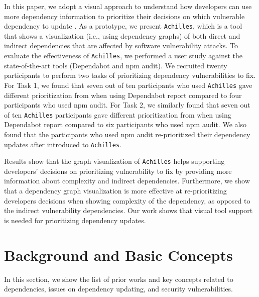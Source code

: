\documentclass[conference]{IEEEtran}
\begin{document}
	In this paper, we adopt a visual approach to understand how developers can use more dependency information to prioritize their decisions on which vulnerable dependency to update \citep{Chen:VISSOFT2020}. 
	As a prototype, we present \texttt{Achilles}, which is a tool that shows a visualization (i.e., using dependency graphs) of both direct and indirect dependencies that are affected by software vulnerability attacks.
	To evaluate the effectiveness of \texttt{Achilles}, we performed a user study against the state-of-the-art tools (Dependabot and npm audit). 
	We recruited twenty participants to perform two tasks of prioritizing dependency vulnerabilities to fix. For Task 1, we found that seven out of ten participants who used \texttt{Achilles} gave different prioritization from when using Dependabot report compared to four participants who used npm audit. For Task 2, we similarly found that seven out of ten \texttt{Achilles} participants gave different prioritization from when using Dependabot report compared to six participants who used npm audit.
	We also found that the participants who used npm audit re-prioritized their dependency updates after introduced to \texttt{Achilles}.
	
	Results show that the graph visualization of \texttt{Achilles} helps supporting developers' decisions on prioritizing vulnerability to fix by providing more information about complexity and indirect dependencies. Furthermore, we show that a dependency graph visualization is more effective at re-prioritizing developers decisions when showing complexity of the dependency, as opposed to the indirect vulnerability dependencies.
	Our work shows that  visual tool support is needed for prioritizing dependency updates.
	
	\section{Background and Basic Concepts}
	In this section, we show the list of prior works and key concepts related to dependencies, issues on dependency updating, and security vulnerabilities.
	
	
\end{document}
